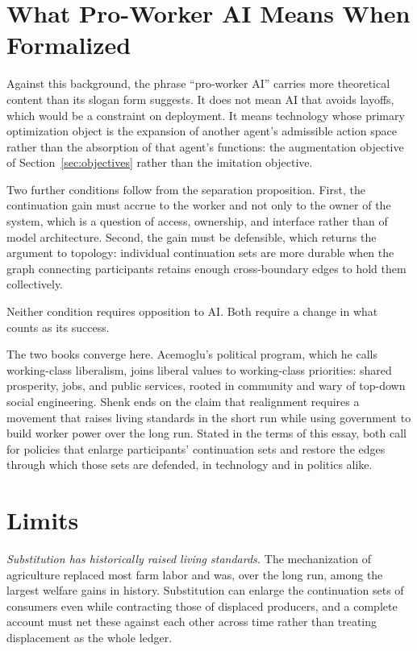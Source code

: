 \documentclass[11pt]{article}
\begin{document}
\section{What Pro-Worker AI Means When Formalized}

Against this background, the phrase ``pro-worker AI'' carries more theoretical content than its slogan form suggests. It does not mean AI that avoids layoffs, which would be a constraint on deployment. It means technology whose primary optimization object is the expansion of another agent's admissible action space rather than the absorption of that agent's functions: the augmentation objective of Section~\ref{sec:objectives} rather than the imitation objective.

Two further conditions follow from the separation proposition. First, the continuation gain must accrue to the worker and not only to the owner of the system, which is a question of access, ownership, and interface rather than of model architecture. Second, the gain must be defensible, which returns the argument to topology: individual continuation sets are more durable when the graph connecting participants retains enough cross-boundary edges to hold them collectively.

Neither condition requires opposition to AI. Both require a change in what counts as its success.

The two books converge here. Acemoglu's political program, which he calls working-class liberalism, joins liberal values to working-class priorities: shared prosperity, jobs, and public services, rooted in community and wary of top-down social engineering. Shenk ends on the claim that realignment requires a movement that raises living standards in the short run while using government to build worker power over the long run. Stated in the terms of this essay, both call for policies that enlarge participants' continuation sets and restore the edges through which those sets are defended, in technology and in politics alike.

\section{Limits}

\emph{Substitution has historically raised living standards.} The mechanization of agriculture replaced most farm labor and was, over the long run, among the largest welfare gains in history. Substitution can enlarge the continuation sets of consumers even while contracting those of displaced producers, and a complete account must net these against each other across time rather than treating displacement as the whole ledger.
\end{document}

